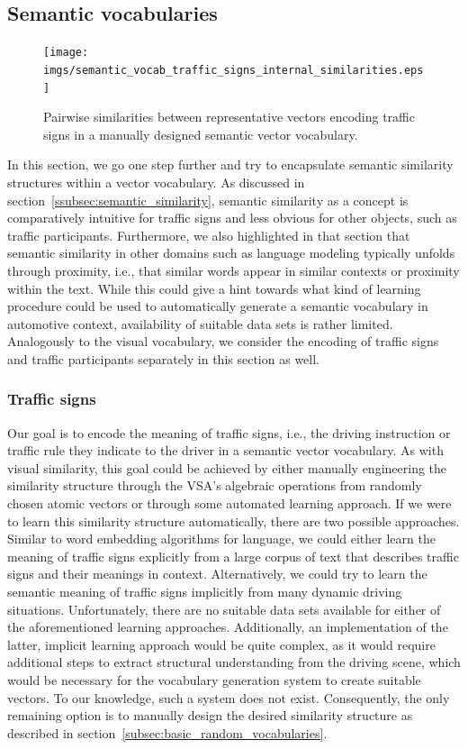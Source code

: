 \subsection{Semantic vocabularies}%
\label{subsec:semantic_vocabularies}

\begin{figure}[t]
    \centering
    \texttt{[image: imgs/semantic\_vocab\_traffic\_signs\_internal\_similarities.eps]}
    \caption{Pairwise similarities between representative vectors encoding traffic signs in a manually designed semantic vector vocabulary.}
    \label{fig:semantic_vocab_traffic_signs_internal_similarities}
\end{figure}
In this section, we go one step further and try to encapsulate semantic similarity structures within a vector vocabulary.
As discussed in section~\ref{ssubsec:semantic_similarity}, semantic similarity as a concept is comparatively intuitive for traffic signs and less obvious for other objects, such as traffic participants.
Furthermore, we also highlighted in that section that semantic similarity in other domains such as language modeling typically unfolds through proximity, i.e., that similar words appear in similar contexts or proximity within the text.
While this could give a hint towards what kind of learning procedure could be used to automatically generate a semantic vocabulary in automotive context, availability of suitable data sets is rather limited.
Analogously to the visual vocabulary, we consider the encoding of traffic signs and traffic participants separately in this section as well. 

\subsubsection{Traffic signs}%
\label{ssubsec:traffic_signs}

Our goal is to encode the meaning of traffic signs, i.e., the driving instruction or traffic rule they indicate to the driver in a semantic vector vocabulary.
As with visual similarity, this goal could be achieved by either manually engineering the similarity structure through the \ac{VSA}'s algebraic operations from randomly chosen atomic vectors or through some automated learning approach.
If we were to learn this similarity structure automatically, there are two possible approaches. 
Similar to word embedding algorithms for language, we could either learn the meaning of traffic signs explicitly from a large  corpus of text that describes traffic signs and their meanings in context.
Alternatively, we could try to learn the semantic meaning of traffic signs implicitly from many dynamic driving situations.
Unfortunately, there are no suitable data sets available for either of the aforementioned learning approaches.
Additionally, an implementation of the latter, implicit learning approach would be quite complex, as it would require additional steps to extract structural understanding from the driving scene, which would be necessary for the vocabulary generation system to create suitable vectors.
To our knowledge, such a system does not exist.
Consequently, the only remaining option is to manually design the desired similarity structure as described in section~\ref{subsec:basic_random_vocabularies}.

